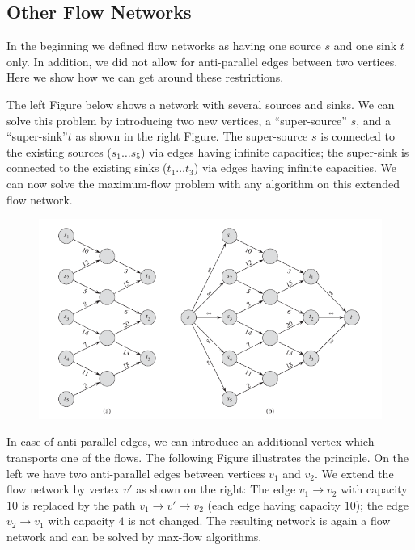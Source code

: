 
\subsection{Other Flow Networks}

In the beginning we defined flow networks as having one source $s$ and one sink $t$ only. In addition, we did not allow for anti-parallel edges between two vertices. Here we show how we can get around these restrictions.

The left Figure below shows a network with several sources and sinks. We can solve this problem by introducing two new vertices, a ``super-source'' $s$, and a ``super-sink''$t$ as shown in the right Figure. The super-source $s$ is connected to the existing sources ($s_1 \ldots s_5$) via edges having infinite capacities; the super-sink is connected to the existing sinks ($t_1 \ldots t_3$) via edges having infinite capacities. We can now solve the maximum-flow problem with any algorithm on this extended flow network.

\begin{figure}[H]
\centering
\includegraphics[scale=0.65]{images/max_flow_04_01.png}
\end{figure}

In case of anti-parallel edges, we can introduce an additional vertex which transports one of the flows. The following Figure illustrates the principle. On the left we have two anti-parallel edges between vertices $v_1$ and $v_2$. We extend the flow network by vertex $v'$ as shown on the right: The edge $v_1 \rightarrow v_2$ with capacity $10$ is replaced by the path $v_1 \rightarrow v' \rightarrow v_2$ (each edge having capacity $10$); the edge $v_2 \rightarrow v_1$ with capacity $4$ is not changed. The resulting network is again a flow network and can be solved by max-flow algorithms.

